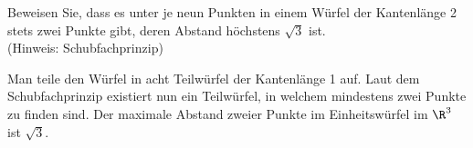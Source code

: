 
\begin{exercise}

Beweisen Sie, dass es unter je neun Punkten in einem Würfel der Kantenlänge 2 stets
zwei Punkte gibt, deren Abstand höchstens $\sqrt{3}$ ist. \\
(Hinweis: Schubfachprinzip)
\end{exercise}


\begin{solution}

Man teile den Würfel in acht Teilwürfel der Kantenlänge 1 auf.
Laut dem Schubfachprinzip existiert nun ein Teilwürfel, in welchem mindestens
zwei Punkte zu finden sind. Der maximale Abstand zweier Punkte im Einheitswürfel
 im $\R^3$ ist $\sqrt{3}$.

\end{solution}

